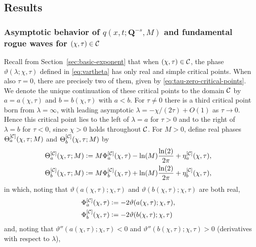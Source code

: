 \subsection{Results}
\subsubsection{Asymptotic behavior of $q(x,t;\mathbf{Q}^{-s},M)$ and fundamental rogue waves for $(\chi,\tau)\in\mathcal{C}$}
\label{sec:results-channels}
Recall from Section~\ref{sec:basic-exponent} that when $(\chi,\tau)\in \mathcal{C}$, the phase $\vartheta(\lambda;\chi,\tau)$ defined in \eqref{eq:vartheta} has only real and simple critical points.  When also $\tau=0$, there are precisely two of them, given by \eqref{eq:tau-zero-critical-points}.  We denote the unique continuation of these critical points to the domain $\mathcal{C}$ by $a=a(\chi,\tau)$ and $b=b(\chi,\tau)$ with $a<b$.  For $\tau\neq 0$ there is a third critical point born from $\lambda=\infty$, with leading asymptotic $\lambda=-\chi/(2\tau)+ O(1)$ as $\tau\to 0$.  Hence this critical point lies to the left of $\lambda=a$ for $\tau>0$ and to the right of $\lambda=b$ for $\tau<0$, since $\chi>0$ holds throughout $\mathcal{C}$.  
For $M>0$, define real phases $\Theta_a^{[\mathcal{C}]}(\chi,\tau;M)$ and $\Theta_b^{[\mathcal{C}]}(\chi,\tau;M)$ by 
\begin{equation}
\begin{split}
\Theta_a^{[\mathcal{C}]}(\chi,\tau;M)&\vcentcolon= M\Phi_a^{[\mathcal{C}]}(\chi,\tau)-\ln(M)\frac{\ln(2)}{2\pi}+\eta_a^{[\mathcal{C}]}(\chi,\tau),\\
\Theta_b^{[\mathcal{C}]}(\chi,\tau;M)&\vcentcolon= M\Phi_b^{[\mathcal{C}]}(\chi,\tau)+\ln(M)\frac{\ln(2)}{2\pi} + \eta_b^{[\mathcal{C}]}(\chi,\tau),
\end{split}
\label{eq:channels-phases}
\end{equation}
in which, noting that $\vartheta(a(\chi,\tau);\chi,\tau)$ and $\vartheta(b(\chi,\tau);\chi,\tau)$ are both real,
\begin{equation}
\begin{split}
\Phi_a^{[\mathcal{C}]}(\chi,\tau)&\vcentcolon= -2\vartheta(a(\chi,\tau);\chi,\tau),\\
\Phi_b^{[\mathcal{C}]}(\chi,\tau)&\vcentcolon= -2\vartheta(b(\chi,\tau);\chi,\tau)
\end{split}
\label{eq:channels-principal-phases}
\end{equation}
and, noting that $\vartheta''(a(\chi,\tau);\chi,\tau)<0$ and $\vartheta''(b(\chi,\tau);\chi,\tau)>0$ (derivatives with respect to $\lambda$),
